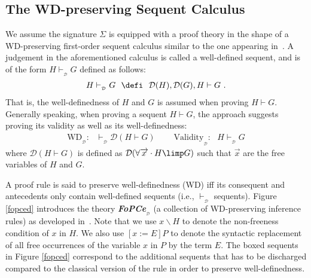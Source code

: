 \documentclass[copyright]{eptcs}
\begin{document}
\subsection{The WD-preserving Sequent Calculus}
We assume the signature $\Sigma$ is equipped with a proof theory in the shape of a WD-preserving first-order sequent calculus similar to the one appearing in~\cite{icfemMehta08}. A judgement in the aforementioned calculus is called a well-defined sequent, and is of the form $H\vdash_{_\mathcal{D}} G$ defined as follows:
\begin{eqnarray*}
H\vdash_{_\mathcal{D}} G~~\defi~~ \mathcal{D}(H),\mathcal{D}(G),H\vdash G~.
\end{eqnarray*}
That is, the well-definedness of $H$ and $G$ is assumed when proving $H\vdash G$. Generally speaking, when proving a sequent $H\vdash G$, the approach suggests proving its validity as well as its well-definedness:
\begin{eqnarray*}
\boxed{\text{WD}_{_\mathcal{D}}:~~~\vdash_{_\mathcal{D}} \mathcal{D}(H\vdash G)}~~~~~~~~~~\boxed{\text{Validity}_{_\mathcal{D}}:~~~H \vdash_{_\mathcal{D}} G}
\end{eqnarray*}
where $\mathcal{D}(H\vdash G)$ is defined as $\mathcal{D}(\forall \overrightarrow{x}\cdot H\limp G)$ such that $\overrightarrow{x}$ are the free variables of $H$ and $G$.
\par
A proof rule is said to preserve well-definedness (WD) iff its consequent and antecedents only contain well-defined sequents (i.e., $\vdash_{_\mathcal{D}}$ sequents). Figure \ref{fopced} introduces the theory \textit{\textbf{FoPCe}}$_{_\mathcal{D}}$ (a collection of WD-preserving inference rules) as developed in~\cite{icfemMehta08}. Note that we use $x\backslash H$ to denote the non-freeness condition of $x$ in $H$.  We also use $[x:=E]P$ to denote the syntactic replacement of all free occurrences of the variable $x$ in $P$ by the term $E$. The boxed sequents in Figure \ref{fopced} correspond to the additional sequents that has to be discharged compared to the classical version of the rule in order to preserve well-definedness.
\end{document}
